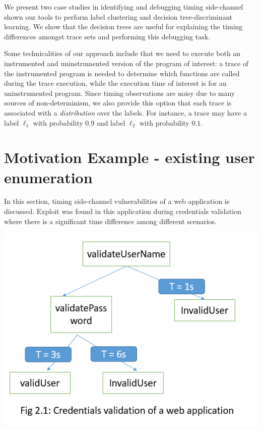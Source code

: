 \documentclass{article}
\begin{document}
We present two case studies in identifying and debugging timing
side-channel shown our tools to
perform label clustering and decision tree-discriminant learning. We show that
the decision trees are useful for explaining the timing
differences amongst trace sets and performing this debugging task.

Some technicalities of our approach include that we need to execute both an
instrumented and uninstrumented version of the program of interest: a trace of
the instrumented program is needed to determine which functions are called during
the trace execution, while the execution time of interest is for an uninstrumented
program. Since timing observations are noisy due to many sources of
non-determinism, we also provide this option that each trace is associated with a
\emph{distribution} over the labels.
For instance, a trace may have a label $\ell_1$ with probability $0.9$
and label $\ell_2$ with probability $0.1$.

\section{Motivation Example - existing user enumeration}
In this section, timing side-channel vulnerabilities of a web application is discussed. Exploit was found in this application during credentials validation where there is a significant time difference among different scenarios.

\vfill
\begin{center}    
  \includegraphics [width=5 in] {validationCheck}
\end{center}
\vfill
  
\end{document}
